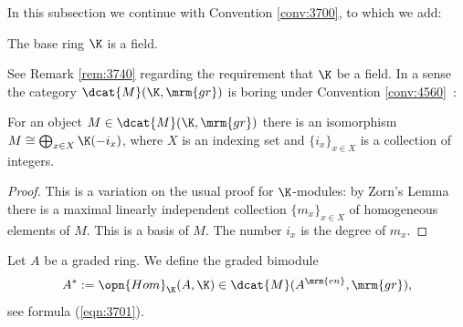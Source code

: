 \label{subsec:props-ag-mods}

In this subsection we continue with Convention \ref{conv:3700}, to which we add:

\begin{conv}  \label{conv:4560}
The base ring $\K$ is a field. 
\end{conv}

See Remark \ref{rem:3740} regarding the requirement that $\K$ be a field. 
In a sense the category $\dcat{M}(\K, \mrm{gr})$ is boring under Convention
\ref{conv:4560}~:

\begin{prop} \label{prop:3851}
For an object $M \in \dcat{M}(\K, \mrm{gr})$ there is an isomorphism
$M \cong \bigoplus_{x \in X} \K(-i_x)$,
where $X$ is an indexing set and $\{ i_x \}_{x \in X}$ is a collection of 
integers. 
\end{prop}

\begin{proof}
This is a variation on the usual proof for $\K$-modules: by Zorn's Lemma there 
is a maximal linearly independent collection 
$\{ m_x \}_{x \in X}$ of homogeneous elements of $M$. 
This is a basis of $M$. The number $i_x$ is the degree of $m_x$.  
\end{proof}

\begin{dfn} \label{dfn:3795}
Let $A$ be a graded ring. 
We define the graded bimodule 
\[ A^* := \opn{Hom}_{\K}(A, \K) \in 
\dcat{M}(A^{\mrm{en}}, \mrm{gr}) , \]
see formula (\ref{eqn:3701}). 
\end{dfn}

